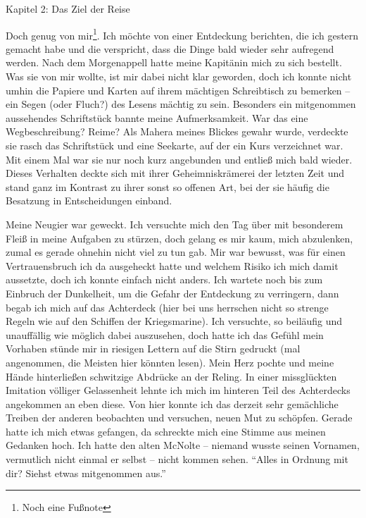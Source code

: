 \vspace{0.5cm}\noindent

{\label{1Kapitel 2: Das Ziel der Reise}\vspace{0.5cm}\noindent\LARGE Kapitel 2: Das Ziel der Reise}
\renewcommand{\storychapter}{Kapitel 2: Das Ziel der Reise}

\vspace{0.5cm}\noindent
{}

Doch genug von mir\footnote{Noch eine Fußnote}. Ich möchte von einer Entdeckung berichten, die ich gestern gemacht habe und die verspricht, dass die Dinge bald wieder sehr aufregend werden. Nach dem Morgenappell hatte meine Kapitänin mich zu sich bestellt. Was sie von mir wollte, ist mir dabei nicht klar geworden, doch ich konnte nicht umhin die Papiere und Karten auf ihrem mächtigen Schreibtisch zu bemerken -- ein Segen (oder Fluch?) des Lesens mächtig zu sein. Besonders ein mitgenommen aussehendes Schriftstück bannte meine Aufmerksamkeit. War das eine Wegbeschreibung? Reime? Als Mahera meines Blickes gewahr wurde, verdeckte sie rasch das Schriftstück und eine Seekarte, auf der ein Kurs verzeichnet war. Mit einem Mal war sie nur noch kurz angebunden und {} entließ mich bald wieder. Dieses Verhalten deckte sich mit ihrer Geheimniskrämerei der letzten Zeit und stand ganz im Kontrast zu ihrer sonst so offenen Art, bei der sie häufig die Besatzung in Entscheidungen einband.

Meine Neugier war geweckt. Ich versuchte mich den Tag über mit besonderem Fleiß in meine Aufgaben zu stürzen, doch gelang es mir kaum, mich abzulenken, zumal es gerade ohnehin nicht viel zu tun gab. Mir war bewusst, was für einen Vertrauensbruch ich da ausgeheckt hatte und welchem Risiko ich mich damit aussetzte, doch ich konnte einfach nicht anders. Ich wartete noch bis zum Einbruch der Dunkelheit, um die Gefahr der Entdeckung zu verringern, dann begab ich mich auf das Achterdeck (hier bei uns herrschen nicht so strenge Regeln wie auf den Schiffen der Kriegsmarine). Ich versuchte, so beiläufig und unauffällig wie möglich dabei auszusehen, doch hatte ich das Gefühl mein Vorhaben stünde mir in riesigen Lettern auf die Stirn gedruckt (mal angenommen, die Meisten hier könnten lesen). Mein Herz pochte und meine Hände hinterließen schwitzige Abdrücke an der Reling. In einer missglückten Imitation völliger Gelassenheit lehnte ich mich im hinteren Teil des Achterdecks angekommen an eben diese. Von hier konnte ich das derzeit sehr gemächliche Treiben der anderen beobachten und versuchen, neuen Mut zu schöpfen. Gerade hatte ich mich etwas gefangen, da schreckte mich eine Stimme aus meinen Gedanken hoch. Ich hatte den alten McNolte -- niemand wusste seinen Vornamen, vermutlich nicht einmal er selbst -- nicht kommen sehen. \enquote{Alles in Ordnung mit dir? Siehst etwas mitgenommen aus.}


